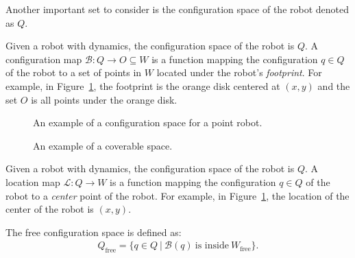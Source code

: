 \documentclass[../main.tex]{subfiles}
\begin{document}

Another important set to consider is the configuration space of the robot denoted as $Q$.
\begin{definition}
\label{definition:c_space_and_map}
Given a robot with dynamics, the configuration space of the robot is $Q$. A configuration map $\mathcal{B}:Q\to O\subseteq W$ is a function mapping the configuration $q\in Q$ of the robot to a set of points in $W$ located under the robot's \emph{footprint}. For example, in Figure~\ref{fig:configuration_space}, the footprint is the orange disk centered at $(x,y)$ and the set $O$ is all points under the orange disk.
\end{definition}

\begin{figure}
	\centering
	
	\caption{An example of a configuration space for a point robot.}
	\label{fig:configuration_space}
\end{figure}

\begin{figure}
	\centering
	
	\caption{An example of a coverable space.}
	\label{fig:coverable_space}
\end{figure}






\begin{definition}
\label{definition:location_map}
Given a robot with dynamics, the configuration space of the robot is $Q$. A location map $\mathcal{L}:Q\to W$ is a function mapping the configuration $q\in Q$ of the robot to a \emph{center} point of the robot. For example, in Figure~\ref{fig:configuration_space}, the location of the center of the robot is $(x,y)$.
\end{definition}


\begin{definition}
\label{definition:free_c_space}
The free configuration space is defined as:
	\begin{equation}
	\begin{aligned}
		Q_{\text{free}}=\{q\in Q\ |\ \mathcal{B}(q)\ \text{is inside}\ W_{\text{free}}\}.
	\end{aligned}
	\end{equation}
\end{definition}
\end{document}
